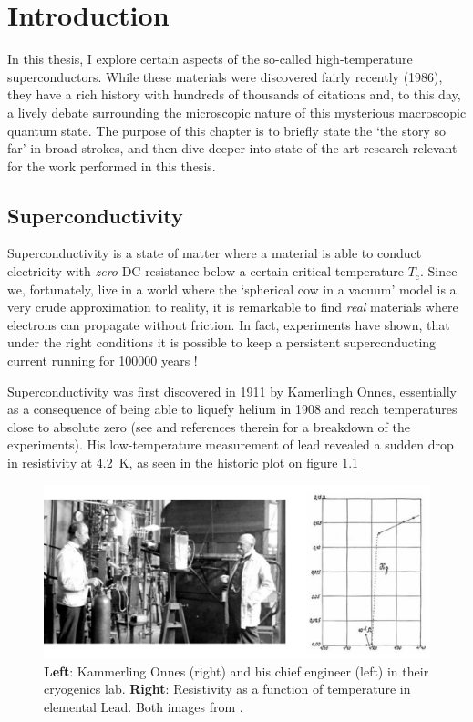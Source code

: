 \chapter{Introduction}\label{ch:intro}

In this thesis, I explore certain aspects of the so-called high-temperature superconductors. While these materials were discovered fairly recently (1986), they have a rich history with hundreds of thousands of citations and, to this day, a lively debate surrounding the microscopic nature of this mysterious macroscopic quantum state. The purpose of this chapter is to briefly state the `the story so far' in broad strokes, and then dive deeper into state-of-the-art research relevant for the work performed in this thesis.

\section{Superconductivity}
Superconductivity is a state of matter where a material is able to conduct electricity with \emph{zero} DC resistance below a certain critical temperature $T_\text{c}$. Since we, fortunately, live in a world where the `spherical cow in a vacuum' model is a very crude approximation to reality, it is remarkable to find \emph{real} materials where electrons can propagate without friction. In fact, experiments have shown, that under the right conditions it is possible to keep a persistent superconducting current running for 100000 years \cite{File1963}!

Superconductivity was first discovered in 1911 by Kamerlingh Onnes, essentially as a consequence of being able to liquefy helium in 1908 and reach temperatures close to absolute zero (see \cite{VanDelft2010} and references therein for a breakdown of the experiments). His low-temperature measurement of lead revealed a sudden drop in resistivity at \SI{4.2}{\kelvin}, as seen in the historic plot on figure \ref{fig:onnes}

\begin{figure}
    \centering
    \includegraphics[width=\textwidth]{fig/intro/onnes.png}
    \caption[SC of elemental lead]{\textbf{Left}: Kammerling Onnes (right) and his chief engineer (left) in their cryogenics lab. \textbf{Right}: Resistivity as a function of temperature in elemental Lead. Both images from \cite{VanDelft2010}.}
    \label{fig:onnes}
\end{figure}

